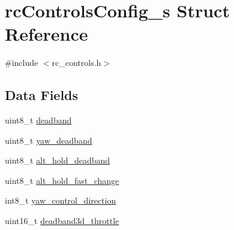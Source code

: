 \hypertarget{structrcControlsConfig__s}{\section{rc\+Controls\+Config\+\_\+s Struct Reference}
\label{structrcControlsConfig__s}
}


{\ttfamily \#include $<$rc\+\_\+controls.\+h$>$}

\subsection*{Data Fields}
\begin{DoxyCompactItemize}
\item 
uint8\+\_\+t \hyperlink{structrcControlsConfig__s_adf25c4afd45bec5224a5c87626771712}{deadband}
\item 
uint8\+\_\+t \hyperlink{structrcControlsConfig__s_acc014749b3aebb39c7758118be2ba1b7}{yaw\+\_\+deadband}
\item 
uint8\+\_\+t \hyperlink{structrcControlsConfig__s_a2d76bae42d54e9b15c88182b5ce6704f}{alt\+\_\+hold\+\_\+deadband}
\item 
uint8\+\_\+t \hyperlink{structrcControlsConfig__s_a6e3ba8c00139c2368bc5acec96f6dc80}{alt\+\_\+hold\+\_\+fast\+\_\+change}
\item 
int8\+\_\+t \hyperlink{structrcControlsConfig__s_a34211474ae7105328dc792e26cd3e94f}{yaw\+\_\+control\+\_\+direction}
\item 
uint16\+\_\+t \hyperlink{structrcControlsConfig__s_acb59a05ee9c207a497e3e1729a546f8f}{deadband3d\+\_\+throttle}
\end{DoxyCompactItemize}


